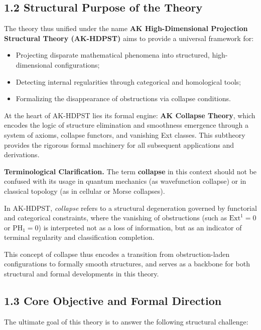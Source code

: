 \documentclass[11pt]{article}
\begin{document}
\subsection*{1.2 Structural Purpose of the Theory}

The theory thus unified under the name  
\textbf{AK High-Dimensional Projection Structural Theory (AK-HDPST)}  
aims to provide a universal framework for:

\begin{itemize}
  \item Projecting disparate mathematical phenomena into structured, high-dimensional configurations;
  \item Detecting internal regularities through categorical and homological tools;
  \item Formalizing the disappearance of obstructions via collapse conditions.
\end{itemize}

At the heart of AK-HDPST lies its formal engine:
\textbf{AK Collapse Theory}, which encodes the logic of structure elimination and smoothness emergence  
through a system of axioms, collapse functors, and vanishing Ext classes.  
This subtheory provides the rigorous formal machinery for all subsequent applications and derivations.

\vspace{0.5em}
\noindent\textbf{Terminological Clarification.}  
The term \textbf{collapse} in this context should not be confused with its usage in quantum mechanics (as wavefunction collapse)  
or in classical topology (as in cellular or Morse collapses).  

In AK-HDPST, \textit{collapse} refers to a structural degeneration governed by functorial and categorical constraints,  
where the vanishing of obstructions (such as $\mathrm{Ext}^1 = 0$ or $\mathrm{PH}_1 = 0$)  
is interpreted not as a loss of information, but as an indicator of terminal regularity and classification completion.  

This concept of collapse thus encodes a transition from obstruction-laden configurations  
to formally smooth structures, and serves as a backbone for both structural and formal developments in this theory.

\subsection*{1.3 Core Objective and Formal Direction}

The ultimate goal of this theory is to answer the following structural challenge:
\end{document}
